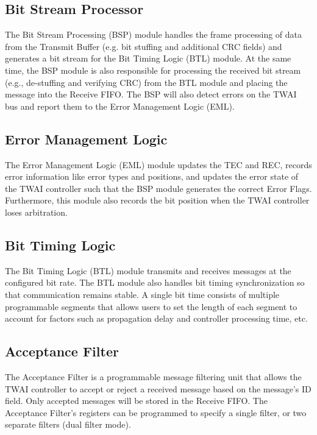 \documentclass[main\_\_EN.tex]{subfiles}
\begin{document}
\subsection{Bit Stream Processor}
The Bit Stream Processing (BSP) module handles the frame processing of data from the Transmit Buffer (e.g. bit stuffing and additional CRC fields) and generates a bit stream for the Bit Timing Logic (BTL) module. At the same time, the BSP module is also responsible for processing the received bit stream (e.g., de-stuffing and verifying CRC) from the BTL module and placing the message into the Receive FIFO. The BSP will also detect errors on the TWAI bus and report them to the Error Management Logic (EML).

\subsection{Error Management Logic}
The Error Management Logic (EML) module updates the TEC and REC, records error information like error types and positions, and updates the error state of the TWAI controller such that the BSP module generates the correct Error Flags. Furthermore, this module also records the bit position when the TWAI controller loses arbitration.

\subsection{Bit Timing Logic}
The Bit Timing Logic (BTL) module transmits and receives messages at the configured bit rate. The BTL module also handles bit timing synchronization so that communication remains stable. A single bit time consists of multiple programmable segments that allows users to set the length of each segment to account for factors such as propagation delay and controller processing time, etc.

\subsection{Acceptance Filter}
The Acceptance Filter is a programmable message filtering unit that allows the TWAI controller to accept or reject a received message based on the message’s ID field. Only accepted messages will be stored in the Receive FIFO. The Acceptance Filter’s registers can be programmed to specify a single filter, or two separate filters (dual filter mode).
\end{document}
